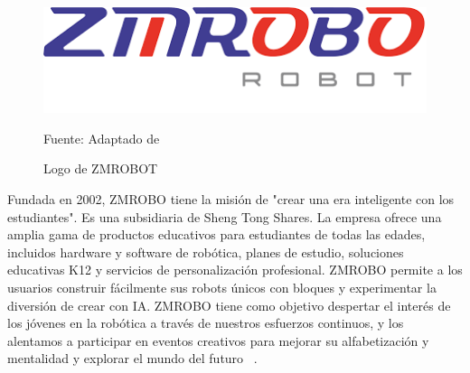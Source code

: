 \begin{figure}[H]
    \centering
    \includegraphics[scale = 0.50]{Imagenes/zmobot_logo.png}
    \caption{Logo de ZMROBOT}{Fuente: Adaptado de ~\cite{zmrobo}}
\end{figure}

Fundada en 2002, ZMROBO tiene la misión de "crear una era inteligente con los estudiantes". Es una subsidiaria de Sheng Tong Shares. La empresa ofrece una amplia gama de productos educativos para estudiantes de todas las edades, incluidos hardware y software de robótica, planes de estudio, soluciones educativas K12 y servicios de personalización profesional.
ZMROBO permite a los usuarios construir fácilmente sus robots únicos con bloques y experimentar la diversión de crear con IA. ZMROBO tiene como objetivo despertar el interés de los jóvenes en la robótica a través de nuestros esfuerzos continuos, y los alentamos a participar en eventos creativos para mejorar su alfabetización y mentalidad y explorar el mundo del futuro ~\cite{zmrobo}.
